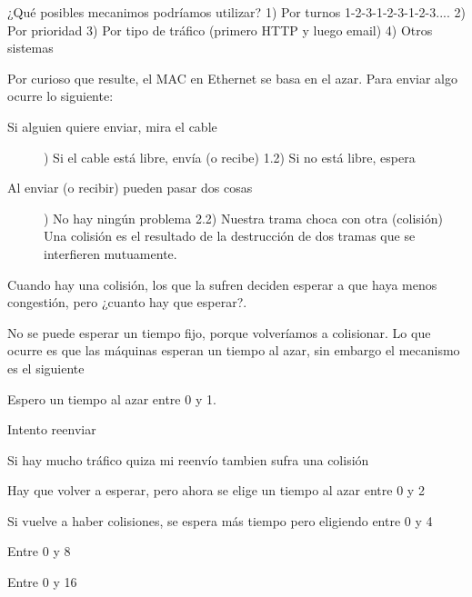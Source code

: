 \documentclass[a4paper,english]{article}
\begin{document}
¿Qué posibles mecanimos podríamos utilizar?
1) Por turnos 1-2-3-1-2-3-1-2-3....
2) Por prioridad
3) Por tipo de tráfico (primero HTTP y luego email)
4) Otros sistemas

Por curioso que resulte, el MAC en Ethernet se basa en el azar. Para enviar algo ocurre lo siguiente:
\setcounter{listcnt0}{0}
\begin{list}{)}
{
\setlength{\rightmargin}{\leftmargin}
}

\item %
\begin{description}
\item[{Si alguien quiere enviar, mira el cable}] ) Si el cable está libre, envía (o recibe)
1.2) Si no está libre, espera

\end{description}

\item %
\begin{description}
\item[{Al enviar (o recibir) pueden pasar dos cosas}] ) No hay ningún problema
2.2) Nuestra trama choca con otra (colisión)
Una colisión es el resultado de la
destrucción de dos tramas que se
interfieren mutuamente.

\end{description}
\end{list}

Cuando hay una colisión, los que la sufren deciden esperar a que haya menos congestión, pero ¿cuanto hay que esperar?.

No se puede esperar un tiempo fijo, porque volveríamos a colisionar. Lo que ocurre es que las máquinas esperan un tiempo al azar, sin embargo el mecanismo es el siguiente
\setcounter{listcnt0}{0}
\begin{list}{)}
{
\setlength{\rightmargin}{\leftmargin}
}

\item Espero un tiempo al azar entre 0 y 1.

\item Intento reenviar

\item Si hay mucho tráfico quiza mi reenvío tambien sufra una colisión

\item Hay que volver a esperar, pero ahora se elige un tiempo al azar entre 0 y 2

\item Si vuelve a haber colisiones, se espera más tiempo pero eligiendo entre 0 y 4

\item Entre 0 y 8

\item Entre 0 y 16
\end{list}
\end{document}
